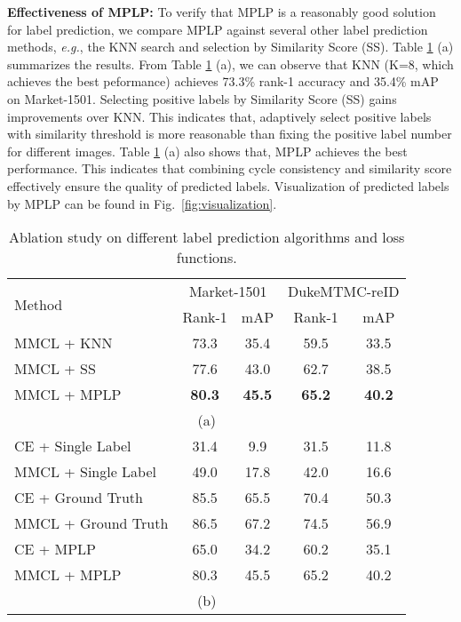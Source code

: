 \documentclass[10pt,twocolumn,letterpaper]{article}
\begin{document}
\textbf{Effectiveness of MPLP:} To verify that MPLP is a reasonably good solution for label prediction, we compare MPLP against several other label prediction methods, \emph{e.g.}, the KNN search and selection by Similarity Score (SS). Table \ref{table:labelandloss} (a) summarizes the results. From Table \ref{table:labelandloss} (a), we can observe that KNN (K=8, which achieves the best peformance) achieves 73.3\% rank-1 accuracy and 35.4\% mAP on Market-1501. Selecting positive labels by Similarity Score (SS) gains improvements over KNN. This indicates that, adaptively select positive labels with similarity threshold is more reasonable than fixing the positive label number for different images. Table \ref{table:labelandloss} (a) also shows that, MPLP achieves the best performance. This indicates that combining cycle consistency and similarity score effectively ensure the quality of predicted labels. Visualization of predicted labels by MPLP can be found in Fig.~\ref{fig:visualization}.


\begin{table}
\footnotesize
\begin{center}
\begin{tabular}{l||c|c||c|c}
\hline
\multirow{2}{*}{Method} & \multicolumn{2}{c||}{Market-1501} & \multicolumn{2}{c}{DukeMTMC-reID}\\
\cline{2-5}
 & Rank-1 & mAP & Rank-1 & mAP  \\
\hline\hline
MMCL + KNN &73.3 & 35.4 & 59.5 & 33.5 \\
MMCL + SS & 77.6 & 43.0 & 62.7 & 38.5 \\
MMCL + MPLP & \textbf{80.3} & \textbf{45.5} & \textbf{65.2} & \textbf{40.2} \\
\hline
\multicolumn{5}{c}{(a)}\\
\hline
CE + Single Label & 31.4 & 9.9 & 31.5 & 11.8 \\
MMCL + Single Label & 49.0 & 17.8 & 42.0 & 16.6\\
CE + Ground Truth & 85.5 & 65.5 & 70.4 & 50.3 \\
MMCL + Ground Truth & 86.5 & 67.2 & 74.5 & 56.9\\
CE + MPLP & 65.0& 34.2 & 60.2 & 35.1\\
MMCL + MPLP & 80.3 & 45.5 & 65.2 & 40.2 \\
\hline
\multicolumn{5}{c}{(b)}\\
\end{tabular}
\end{center}
\vspace{-2mm}
\caption{Ablation study on different label prediction algorithms and loss functions.}
\vspace{-2mm}
\label{table:labelandloss}
\end{table}
\end{document}
